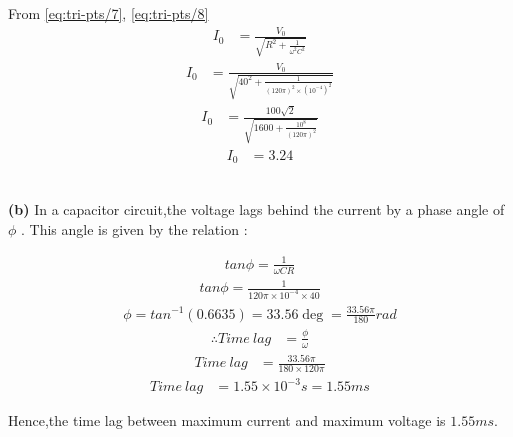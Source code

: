 \documentclass[journal,12pt,twocolumn]{IEEEtran}
\theoremstyle{remark}
\begin{document}
From \eqref{eq:tri-pts/7}, \eqref{eq:tri-pts/8}\\
\begin{align}
	\label{eq:tri-pts/9}I_0 &=\frac{V_0}{\sqrt{R^2 + \frac{1}{\omega^2C^2}}}
\end{align}
\begin{align}
	\label{eq:tri-pts/10}I_0 &=\frac{V_0}{\sqrt{40^2 + \frac{1}{{(120\pi)^2 \times (10^{-4})^2}}}}
\end{align}
\begin{align}
	\label{eq:tri-pts/11}I_0 &=\frac{100\sqrt{2}}{\sqrt{1600+\frac{10^8}{(120\pi)^2}}}
\end{align}
\begin{align}
	\label{eq:tri-pts/12}I_0 &=3.24
\end{align}
\\

\begin{flushleft}\textbf{(b)} In a capacitor circuit,the voltage lags behind the current by a phase angle of $\phi$ . This angle is given by the relation
:\\
\end{flushleft}
\begin{align}
	\label{eq:tri-pts/13} tan\phi=\frac{1}{\omega CR}
\end{align}
\begin{align}
	\label{eq:tri-pts/14}tan\phi=\frac{1}{120\pi \times 10^{-4} \times 40}
\end{align}
\begin{align}
	\label{eq:tri-pts/15} \phi = tan^{-1} (0.6635)=33.56\deg =\frac{33.56\pi}{180}rad
\end{align}
\begin{align}
	\label{eq:tri-pts/16} \therefore Time\: lag &=\frac{\phi}{\omega}
\end{align}
\begin{align}
	\label{eq:tri-pts/17}Time\: lag &=\frac{33.56\pi}{180 \times 120\pi}
\end{align}
\begin{align}
	\label{eq:tri-pts/18}Time\: lag &=1.55 \times 10^{-3}s=1.55ms
\end{align}

Hence,the time lag between maximum current and maximum voltage is $1.55ms$.
\end{document}

